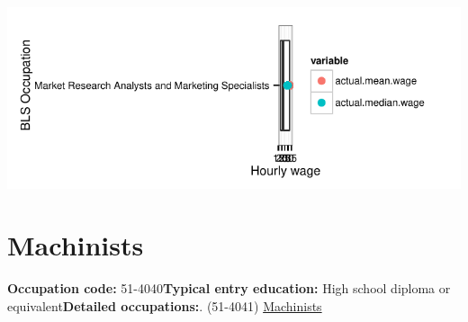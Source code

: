 \documentclass[a4paper,10pt]{article}\usepackage[]{graphicx}\usepackage[]{color}
\makeatletter
\def\maxwidth{ %
  \ifdim\Gin@nat@width>\linewidth
    \linewidth
  \else
    \Gin@nat@width
  \fi
}
\makeatother
\begin{document}
{\centering \includegraphics[width=\maxwidth]{figure/unnamed-chunk-285} 

}


\newpage\section{Machinists}\textbf{Occupation code:} 51-4040\newline\textbf{Typical entry education:} High school diploma or equivalent\newline\textbf{Detailed occupations:}. (51-4041)  \href{http://www.bls.gov/oes/current/oes514041.htm}{Machinists}\newline%
\end{document}
